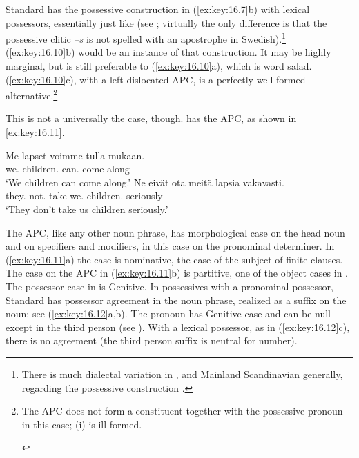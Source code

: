 \documentclass[output=paper]{langsci/langscibook}
\begin{document}
Standard  has the possessive construction in (\ref{ex:key:16.7}b) with
lexical possessors, essentially just like  (see
\citealt{Delsing1998,Julien2005}; virtually the only difference is that the possessive clitic
\emph{–s} is not spelled with an apostrophe in Swedish).\footnote{There is much
dialectal variation in , and Mainland Scandinavian generally, regarding
the possessive construction
\parencite{HolmbergSandstrom1996,Delsing1998,Julien2005}.}
(\ref{ex:key:16.10}b) would be an instance of that construction. It may be
highly marginal, but is still preferable to (\ref{ex:key:16.10}a), which is
word salad. (\ref{ex:key:16.10}c), with a left-dislocated
\gls{APC}, is a perfectly well formed
alternative.\footnote{The \gls{APC} does
    not form a constituent together with the possessive pronoun in this case;
    (i) is ill formed.

\begin{exe}
\end{exe}}

This is not a universally the case, though.  has the \gls{APC}, as shown in
\eqref{ex:key:16.11}.

\ea
    \label{ex:key:16.11}
	\ea
		\gll Me lapset                      voimme  tulla mukaan. \\
			we.\Nom{} children.\Nom{} can.\Fpl{} come along\\
		\glt    `We children can come along.'
	\ex
		\gll Ne  eivät      ota  meitä    lapsia         vakavasti.\\
			they.\Nom{} not.\Tpl{}  take we.\Part{} children.\Part{} seriously\\
		\glt    `They don’t take us children seriously.'
	\z
\z

The  \gls{APC}, like any other noun
phrase, has morphological case on the head noun and on specifiers and
modifiers, in this case on the pronominal determiner. In (\ref{ex:key:16.11}a)
the case is nominative, the case of the subject of finite
clauses. The case on the \gls{APC} in
(\ref{ex:key:16.11}b) is partitive, one of the object cases in . The
possessor case in  is Genitive.  In possessives with a pronominal
possessor, Standard  has possessor agreement in the noun phrase,
realized as a suffix on the noun; see (\ref{ex:key:16.12}a,b).  The pronoun has
Genitive case and can be null except in the third person (see
\citealt{BratticoHuhmarniemi2015}). With a lexical possessor, as in
(\ref{ex:key:16.12}c), there is no agreement (the third person suffix is
neutral for number).
\end{document}

